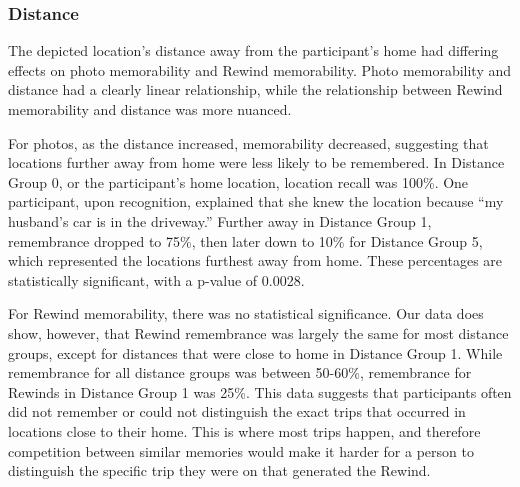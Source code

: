 \documentclass{sigchi}
\begin{document}
\subsubsection{Distance}
The depicted location's distance away from the participant’s home had differing effects on photo memorability and Rewind memorability. Photo memorability and distance had a clearly linear relationship, while the relationship between Rewind memorability and distance was more nuanced. 

For photos, as the distance increased, memorability decreased, suggesting that locations further away from home were less likely to be remembered. In Distance Group 0, or the participant's home location, location recall was 100\%. One participant, upon recognition, explained that she knew the location because ``my husband's car is in the driveway.'' Further away in Distance Group 1, remembrance dropped to 75\%, then later down to 10\% for Distance Group 5, which represented the locations furthest away from home. These percentages are statistically significant, with a p-value of 0.0028. 

For Rewind memorability, there was no statistical significance. Our data does show, however, that Rewind remembrance was largely the same for most distance groups, except for distances that were close to home in Distance Group 1. While remembrance for all distance groups was between 50-60\%, remembrance for Rewinds in Distance Group 1 was 25\%. This data suggests that participants often did not remember or could not distinguish the exact trips that occurred in locations close to their home. This is where most trips happen, and therefore competition between similar memories would make it harder for a person to distinguish the specific trip they were on that generated the Rewind.
\end{document}

